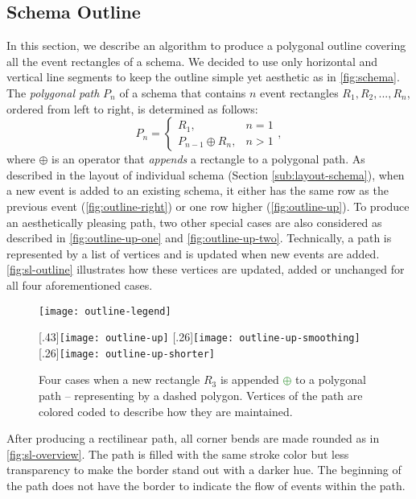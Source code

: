 \subsection{Schema Outline}
In this section, we describe an algorithm to produce a polygonal outline covering all the event rectangles of a schema. We decided to use only horizontal and vertical line segments to keep the outline simple yet aesthetic as in \autoref{fig:schema}. The \emph{polygonal path} $P_n$ of a schema that contains $n$ event rectangles $R_1, R_2, ..., R_n$, ordered from left to right, is determined as follows:
\[
P_n=
\begin{cases}
R_1, & n=1 \\
P_{n-1} \oplus R_n, & n > 1
\end{cases},
\]
where $\oplus$ is an operator that \emph{appends} a rectangle to a polygonal path. As described in the layout of individual schema (Section \ref{sub:layout-schema}), when a new event is added to an existing schema, it either has the same row as the previous event (\autoref{fig:outline-right}) or one row higher (\autoref{fig:outline-up}). To produce an aesthetically pleasing path, two other special cases are also considered as described in \autoref{fig:outline-up-one} and \autoref{fig:outline-up-two}. Technically, a path is represented by a list of vertices and is updated when new events are added. \autoref{fig:sl-outline} illustrates how these vertices are updated, added or unchanged for all four aforementioned cases.

\begin{figure}[!htb]
	\centering
	\texttt{[image: outline-legend]}\bigskip\\
	
	\vspace{.5\baselineskip}
	
	[.43\linewidth]{\texttt{[image: outline-up]}}
	\hfill
	[.26\linewidth]{\texttt{[image: outline-up-smoothing]}}
	\hfill
	[.26\linewidth]{\texttt{[image: outline-up-shorter]}}
	\caption{Four cases when a new rectangle \colorbox{f2!40}{$R_3$} is appended \textcolor{ForestGreen}{$\pmb{\oplus}$} to a polygonal path -- representing by a dashed polygon. Vertices of the path are colored coded to describe how they are maintained.}
	\label{fig:sl-outline}
\end{figure}

After producing a rectilinear path, all corner bends are made rounded as in \autoref{fig:sl-overview}. The path is filled with the same stroke color but less transparency to make the border stand out with a darker hue. The beginning of the path does not have the border to indicate the flow of events within the path. 